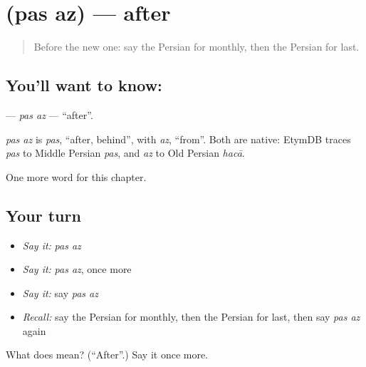 \section[\texorpdfstring{\fa{پس} \fa{از} (pas az)}{پس از (pas az)}]{  (pas az) — after}

\label{lesson:FA-C152-pas-az}



\begin{quote}
Before the new one: say the Persian for monthly, then the Persian for last.
\end{quote}

\subsection*{You'll want to know:  }
\textbf{ } — \emph{pas az} — \textquotedblleft{}after\textquotedblright{}.

\begin{cousinweb}
\emph{pas az} is \emph{pas}, \textquotedblleft{}after, behind\textquotedblright{}, with \emph{az}, \textquotedblleft{}from\textquotedblright{}. Both are native: EtymDB traces \emph{pas} to Middle Persian \emph{pas}, and \emph{az} to Old Persian \emph{hacā}.
\end{cousinweb}

\begin{grammarlens}[title={What you've built}]
One more word for this chapter.
\end{grammarlens}

\subsection*{Your turn}
\begin{itemize}
\raggedright
  \item \emph{Say it:} \emph{pas az}
  \item \emph{Say it:} \emph{pas az}, once more
  \item \emph{Say it:} say \emph{pas az}
  \item \emph{Recall:} say the Persian for monthly, then the Persian for last, then say \emph{pas az} again
\end{itemize}

\begin{tcolorbox}[breakable,colback=teal!4,colframe=teal!35!black,title={Before you move on}]
What does   mean? (\textquotedblleft{}After\textquotedblright{}.) Say it once more.
\end{tcolorbox}
